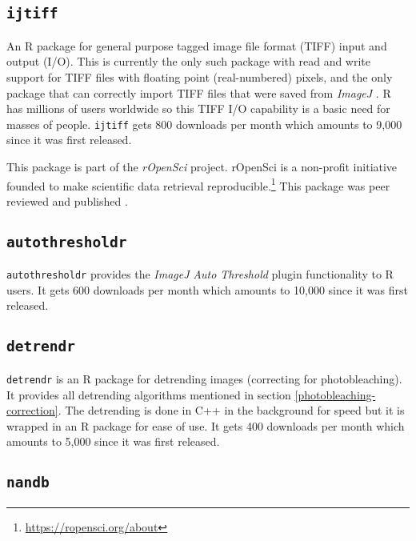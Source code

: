 \documentclass[12pt,]{book}
\let\rmarkdownfootnote\footnote%
\def\footnote{\protect\rmarkdownfootnote}
\theoremstyle{definition}
\theoremstyle{definition}
\theoremstyle{definition}
\theoremstyle{remark}
\begin{document}
\subsection{\texorpdfstring{\texttt{ijtiff}}{ijtiff}}\label{ijtiff}

An R package for general purpose tagged image file format (TIFF) input
and output (I/O). This is currently the only such package with read and
write support for TIFF files with floating point (real-numbered) pixels,
and the only package that can correctly import TIFF files that were
saved from \emph{ImageJ} \citep{ImageJ}. R has millions of users
worldwide so this TIFF I/O capability is a basic need for masses of
people. \texttt{ijtiff} gets 800 downloads per month which amounts to
9,000 since it was first released.

This package is part of the \emph{rOpenSci} project. rOpenSci is a
non-profit initiative founded to make scientific data retrieval
reproducible.\footnote{\url{https://ropensci.org/about}} This package
was peer reviewed and published \citep{ijtiff}.

\subsection{\texorpdfstring{\texttt{autothresholdr}}{autothresholdr}}\label{autothresholdr}

\texttt{autothresholdr} provides the \emph{ImageJ} \citep{ImageJ}
\emph{Auto Threshold} plugin \citep{autothresholdr} functionality to R
users. It gets 600 downloads per month which amounts to 10,000 since it
was first released.

\subsection{\texorpdfstring{\texttt{detrendr}}{detrendr}}\label{detrendr}

\texttt{detrendr} is an R package for detrending images (correcting for
photobleaching). It provides all detrending algorithms mentioned in
section \ref{photobleaching-correction}. The detrending is done in C++
in the background for speed but it is wrapped in an R package for ease
of use. It gets 400 downloads per month which amounts to 5,000 since it
was first released.

\subsection{\texorpdfstring{\texttt{nandb}}{nandb}}\label{nandb}
\end{document}
